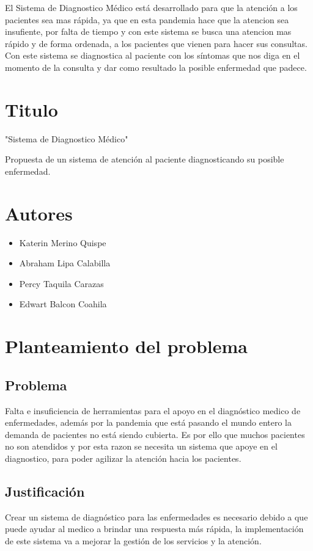 \documentclass[preprint,12pt]{elsarticle}
\begin{document}
El Sistema de Diagnostico Médico está desarrollado para que la atención a los pacientes sea mas rápida, ya que en esta pandemia hace que la atencion sea insufiente, por falta de tiempo y con este sistema se busca una atencion mas rápido y de forma ordenada, a los pacientes que vienen para hacer sus consultas. Con este sistema se diagnostica al paciente con los síntomas que nos diga en el momento de la consulta y dar como resultado la posible enfermedad que padece.

\section{Titulo}
"Sistema de Diagnostico Médico"

Propuesta de un sistema de atención al paciente diagnosticando su posible enfermedad.
\section{Autores}
\begin{itemize}
    \item Katerin Merino Quispe
    \item Abraham Lipa Calabilla
    \item Percy Taquila Carazas
    \item Edwart Balcon Coahila
    
\end{itemize}
\section{Planteamiento del problema}
	\subsection{\textbf{Problema}}
Falta e insuficiencia de herramientas para el apoyo en el diagnóstico medico de enfermedades, además por la pandemia que está pasando el mundo entero la demanda de pacientes no está siendo cubierta. Es por ello que muchos pacientes no son atendidos y por esta razon se necesita un sistema que apoye en el diagnostico, para poder agilizar la atención hacia los pacientes.
	\subsection{\textbf{Justificación }}
Crear un sistema de diagnóstico para las enfermedades es necesario debido a que puede ayudar al medico a brindar una respuesta más rápida, la implementación de este sistema va a mejorar la gestión de los servicios y la atención.
\end{document}

